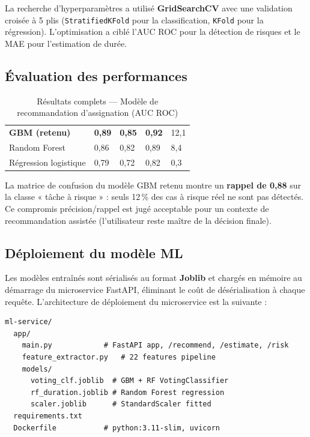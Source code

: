 La recherche d'hyperparamètres a utilisé \textbf{GridSearchCV} avec une
validation croisée à 5 plis (\texttt{StratifiedKFold} pour la classification,
\texttt{KFold} pour la régression). L'optimisation a ciblé l'AUC ROC pour la
détection de risques et le MAE pour l'estimation de durée.

\subsection{Évaluation des performances}

\begin{table}[H]
  \centering
  \caption{Résultats complets — Modèle de recommandation d'assignation (AUC ROC)}
  \label{tab:eval_recommandation}
  \begin{tabularx}{\textwidth}{L{5cm}C{2.5cm}C{2.5cm}C{2.5cm}C{2cm}}
    \toprule
     &  &  &  &  \\
    \midrule
    \textbf{GBM (retenu)} & \textbf{0,89} & \textbf{0,85} & \textbf{0,92} & 12,1 \\
    Random Forest         & 0,86          & 0,82          & 0,89          & 8,4 \\
    Régression logistique & 0,79          & 0,72          & 0,82          & 0,3 \\
    \bottomrule
  \end{tabularx}
\end{table}

La matrice de confusion du modèle GBM retenu montre un \textbf{rappel de 0,88}
sur la classe « tâche à risque » : seuls 12\,\% des cas à risque réel ne sont pas
détectés. Ce compromis précision/rappel est jugé acceptable pour un contexte de
recommandation assistée (l'utilisateur reste maître de la décision finale).

\subsection{Déploiement du modèle ML}

Les modèles entraînés sont sérialisés au format \textbf{Joblib} et chargés en
mémoire au démarrage du microservice FastAPI, éliminant le coût de désérialisation
à chaque requête. L'architecture de déploiement du microservice est la suivante :

\begin{lstlisting}[style=yamlstyle,caption={Structure du microservice FastAPI},
  label={lst:fastapi_structure}]
ml-service/
  app/
    main.py            # FastAPI app, /recommend, /estimate, /risk
    feature_extractor.py   # 22 features pipeline
    models/
      voting_clf.joblib  # GBM + RF VotingClassifier
      rf_duration.joblib # Random Forest regression
      scaler.joblib      # StandardScaler fitted
  requirements.txt
  Dockerfile           # python:3.11-slim, uvicorn
\end{lstlisting}

